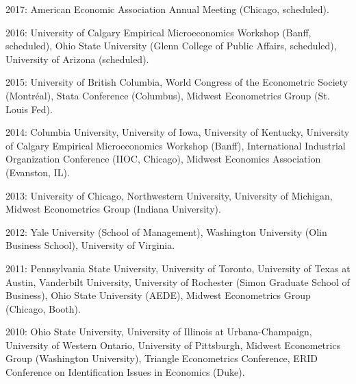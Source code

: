 \documentclass[10pt,letterpaper]{article}
\renewenvironment{itemize}{
  \begin{list}{}{
    \setlength{\leftmargin}{1.5em}
    \setlength{\itemsep}{0.25em}
    \setlength{\parskip}{0pt}
    \setlength{\parsep}{0.25em}
  }
}{
  \end{list}
}
\begin{document}
\begin{itemize}
\item 2017:
  American Economic Association Annual Meeting (Chicago, scheduled).
\item 2016:
  University of Calgary Empirical Microeconomics Workshop (Banff, scheduled),
  Ohio State University (Glenn College of Public Affairs, scheduled),
  University of Arizona (scheduled).
\item 2015:
  University of British Columbia,
  World Congress of the Econometric Society (Montr\'{e}al),
  Stata Conference (Columbus),
  Midwest Econometrics Group (St. Louis Fed).
\item 2014:
  Columbia University,
  University of Iowa,
  University of Kentucky,
  University of Calgary Empirical Microeconomics Workshop (Banff),
  International Industrial Organization Conference (IIOC, Chicago),
  Midwest Economics Association (Evanston, IL).
\item 2013:
  University of Chicago,
  Northwestern University,
  University of Michigan,
  Midwest Econometrics Group (Indiana University).
\item 2012:
  Yale University (School of Management),
  Washington University (Olin Business School),
  University of Virginia.
\item 2011:
  Pennsylvania State University,
  University of Toronto,
  University of Texas at Austin,
  Vanderbilt University,
  University of Rochester (Simon Graduate School of Business),
  Ohio State University (AEDE),
  Midwest Econometrics Group (Chicago, Booth).
\item 2010:
  Ohio State University,
  University of Illinois at Urbana-Champaign,
  University of Western Ontario,
  University of Pittsburgh,
  Midwest Econometrics Group (Washington University),
  Triangle Econometrics Conference,
  ERID Conference on Identification Issues in Economics (Duke).
\end{itemize}
\end{document}
